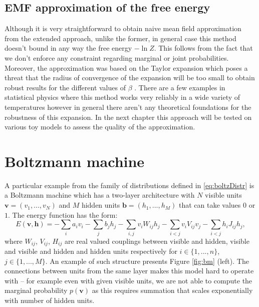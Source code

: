 
\subsection{EMF approximation of the free energy}
Although it is very straightforward to obtain naive mean field approximation from the extended approach, unlike the former, in general case this method doesn't bound in any way the free energy $-\ln Z$. This follows from the fact that we don't enforce any constraint regarding marginal or joint probabilities. Moreover, the approximation was based on the Taylor expansion which poses a threat that the radius of convergence of the expansion will be too small to obtain robust results for the different values of $\beta$ \cite{yedidia2001idiosyncratic}.
There are a few examples in statistical physics where this method works very reliably in a wide variety of temperatures  \cite{plefka1982convergence} however in general there aren't any theoretical foundations for the robustness of this expansion. In the next chapter this approach will be tested on various toy models to assess the quality of the approximation.

\section{Boltzmann machine}
A particular example from the family of distributions defined in \ref{eq:boltzDistr} is a Boltzmann machine \cite{ackley1985learning}
 which has a two-layer architecture with $N$ visible units $\mathbf{v
} = (v_1, ..., v_N)$ and $ M$ hidden units $\mathbf{b} = (h_1,..., h_M)$ that can take values $0$ or $1$. The energy function has the form:
$$ E (\mathbf{v,h}) = - \sum_i a_i v_i - \sum_j b_j h_j - \sum_{i,j} v_i W_{ij}h_j - \sum_{i < j} v_i V_{ij} v_j - \sum_{i < j} h_i J_{ij} h_j,$$
where $W_{ij}$, $V_{ij}$, $H_{ij}$ are real valued couplings between visible and hidden, visible and visible and hidden and hidden units respectively for $i \in \{1,..., n \}$, $j \in \{1, ..., M \}$. An example of such structure presents Figure \ref{fig:bm} (left). The connections between units from the same layer makes this model hard to operate with -- for example even with given visible units, we are not able to compute the marginal probability $p(\mathbf{v})$ as this requires summation that scales exponentially with number of hidden units.

